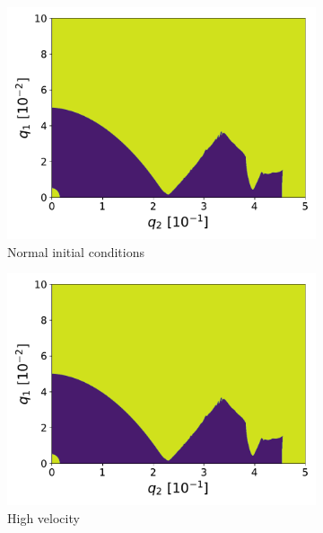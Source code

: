 \begin{figure}[H]
\begin{subfigure}{.3\textwidth}
  \centering
  \includegraphics[width=\linewidth]{img/0_ions_1_electrons_q1_0.0-0.1_q2_0.0-0.5_960x960_3.pdf}
  \caption{Normal initial conditions}
  \label{fig:normal_conds-3}
\end{subfigure}%
\begin{subfigure}{.3\textwidth}
  \centering
  \includegraphics[width=\linewidth]{img/0_ions_1_electrons_q1_0.0-0.1_q2_0.0-0.5_960x960_3.pdf}
  \caption{High velocity}
  \label{fig:high_velocity-3}
\end{subfigure}%
\begin{subfigure}{.3\textwidth}
  \centering

\end{subfigure}
\end{figure}
